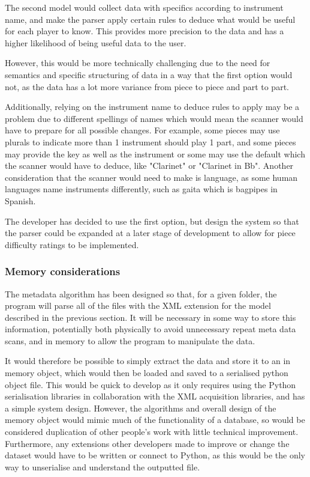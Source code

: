 The second model would collect data with specifics according to instrument name, and make the parser apply certain rules to deduce what would be useful for each player to know. This provides more precision to the data and has a higher likelihood of being useful data to the user. 

However, this would be more technically challenging due to the need for semantics and specific structuring of data in a way that the first option would not, as the data has a lot more variance from piece to piece and part to part. 

Additionally, relying on the instrument name to deduce rules to apply may be a problem due to different spellings of names which would mean the scanner would have to prepare for all possible changes. For example, some pieces may use plurals to indicate more than 1 instrument should play 1 part, and some pieces may provide the key as well as the instrument or some may use the default which the scanner would have to deduce, like "Clarinet" or "Clarinet in Bb". Another consideration that the scanner would need to make is language, as some human languages name instruments differently, such as gaita which is bagpipes in Spanish.

The developer has decided to use the first option, but design the system so that the parser could be expanded at a later stage of development to allow for piece difficulty ratings to be implemented.

\subsubsection{Memory considerations}
The metadata algorithm has been designed so that, for a given folder, the program will parse all of the files with the XML extension for the model described in the previous section. It will be necessary in some way to store this information, potentially both physically to avoid unnecessary repeat meta data scans, and in memory to allow the program to manipulate the data.

It would therefore be possible to simply extract the data and store it to an in memory object, which would then be loaded and saved to a serialised python object file. This would be quick to develop as it only requires using the Python serialisation libraries in collaboration with the XML acquisition libraries, and has a simple system design. 
However, the algorithms and overall design of the memory object would mimic much of the functionality of a database, so would be considered duplication of other people's work with little technical improvement. 
Furthermore, any extensions other developers made to improve or change the dataset would have to be written or connect to Python, as this would be the only way to unserialise and understand the outputted file.

